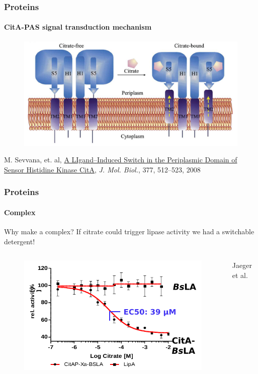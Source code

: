 \documentclass[english]{beamer}
\begin{document}
\begin{frame}
    \frametitle{Proteins}
    \framesubtitle{CitA-PAS signal transduction mechanism}
    \begin{figure}
        \includegraphics[width=.9\linewidth]{figures/CitA_mechanism.png}
    \end{figure}      

    \tiny
    M. Sevvana, et. al,
    \href{http://www.sciencedirect.com/science/article/pii/S0022283608000466}
    {A LIgand--Induced Switch in the Periplasmic Domain of Sensor Histidine Kinase CitA},
    \textit{J. Mol. Biol.}, 377, 512--523, 2008

\end{frame}  


\begin{frame}
    \frametitle{Proteins}
    \framesubtitle{Complex}

    \begin{block}{Why make a complex?}
        If citrate could trigger lipase activity we had a switchable detergent!
    \end{block}

    \pause

    \begin{columns}[t]
        \begin{figure}
            \includegraphics[width=.7\linewidth]{figures/complex/dose_response_curve.png}
        \end{figure}       

        \tiny
        Jaeger et al.
    \end{columns}

\end{frame}  
\end{document}
